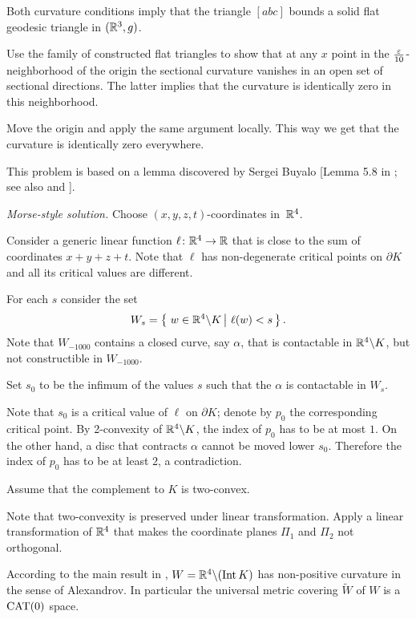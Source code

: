 Both curvature conditions imply that the triangle $[abc]$ bounds a solid flat geodesic triangle in   $(\mathbb{R}^3,g)$.

Use the family of constructed flat triangles 
to show that at any $x$ point in the $\tfrac{\varepsilon}{10}$-neighborhood of the origin
the sectional curvature 
vanishes in an open set of sectional directions.
The latter implies that the curvature is identically zero 
in this neighborhood.

Move the origin and apply the same argument locally.
This way we get that the curvature is identically zero everywhere.
\qeds

This problem is based on a lemma discovered by Sergei Buyalo [Lemma 5.8 in ; see also  and ].

\textit{Morse-style solution.}
Choose $(x,y,z,t)$-coordinates in~$\mathbb{R}^4$.

Consider a generic linear function $\ell\colon\mathbb{R}^4\to\mathbb{R}$ that is close to the sum of coordinates $x+y+z+t$.
Note that $\ell$
has non-degenerate critical points on $\partial K$ and all its critical values are different.

For each $s$ consider the set 
$$W_s=\set{w\in \RR^4\backslash K}{\ell(w)<s}.$$
Note that $W_{-1000}$ contains a closed curve, say $\alpha$, that is contactable in $\mathbb{R}^4\backslash K$, but not constructible in $W_{-1000}$.

Set $s_0$ to be the infimum of the values $s$ such that
the $\alpha$ is contactable in $W_s$.

Note that $s_0$ is a critical value of $\ell$ on $\partial K$;
denote by $p_0$ the corresponding critical point.
By 2-convexity of $\mathbb{R}^4\backslash K$,
the index of $p_0$ has to be at most $1$.
On the other hand, a disc that contracts $\alpha$ cannot be moved lower $s_0$.
Therefore the index of $p_0$ has to be at least $2$, a contradiction.
\qeds

Assume that the complement to $K$ is two-convex.

Note that two-convexity is preserved under linear transformation.
Apply a linear transformation of $\mathbb{R}^4$ that makes the coordinate planes $\Pi_1$ and $\Pi_2$ not orthogonal.

According to the main result in \cite{ABB}, $W\z=\RR^4\backslash (\Int K)$ has non-positive curvature in the sense of Alexandrov.
In particular the universal metric covering $\tilde W$ of $W$ is a $\operatorname{\rm CAT}\nolimits(0)$ space.

